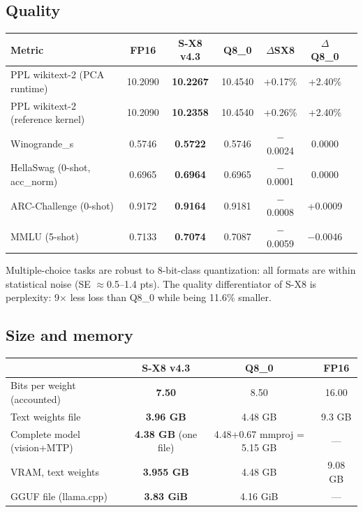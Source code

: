 \documentclass[11pt]{article}
\begin{document}
\subsection{Quality}
\begin{center}
\begin{tabular}{lcccccc}
\toprule
Metric & FP16 & \textbf{S-X8 v4.3} & Q8\_0 & $\Delta$SX8 & $\Delta$Q8\_0 \\
\midrule
PPL wikitext-2 (PCA runtime) & 10.2090 & \textbf{10.2267} & 10.4540 & +0.17\% & +2.40\% \\
PPL wikitext-2 (reference kernel) & 10.2090 & \textbf{10.2358} & 10.4540 & +0.26\% & +2.40\% \\
Winogrande\_s & 0.5746 & \textbf{0.5722} & 0.5746 & $-$0.0024 & 0.0000 \\
HellaSwag (0-shot, acc\_norm) & 0.6965 & \textbf{0.6964} & 0.6965 & $-$0.0001 & 0.0000 \\
ARC-Challenge (0-shot) & 0.9172 & \textbf{0.9164} & 0.9181 & $-$0.0008 & +0.0009 \\
MMLU (5-shot) & 0.7133 & \textbf{0.7074} & 0.7087 & $-$0.0059 & $-$0.0046 \\
\bottomrule
\end{tabular}
\end{center}
Multiple-choice tasks are robust to 8-bit-class quantization: all formats are within statistical noise
(SE $\approx$0.5--1.4 pts). The quality differentiator of S-X8 is perplexity: 9$\times$ less loss than
Q8\_0 while being 11.6\% smaller.

\subsection{Size and memory}
\begin{center}
\begin{tabular}{lccc}
\toprule
 & \textbf{S-X8 v4.3} & Q8\_0 & FP16 \\
\midrule
Bits per weight (accounted) & \textbf{7.50} & 8.50 & 16.00 \\
Text weights file & \textbf{3.96 GB} & 4.48 GB & 9.3 GB \\
Complete model (vision+MTP) & \textbf{4.38 GB} (one file) & 4.48+0.67 mmproj = 5.15 GB & --- \\
VRAM, text weights & \textbf{3.955 GB} & 4.48 GB & 9.08 GB \\
GGUF file (llama.cpp) & \textbf{3.83 GiB} & 4.16 GiB & --- \\
\bottomrule
\end{tabular}
\end{center}
\end{document}
